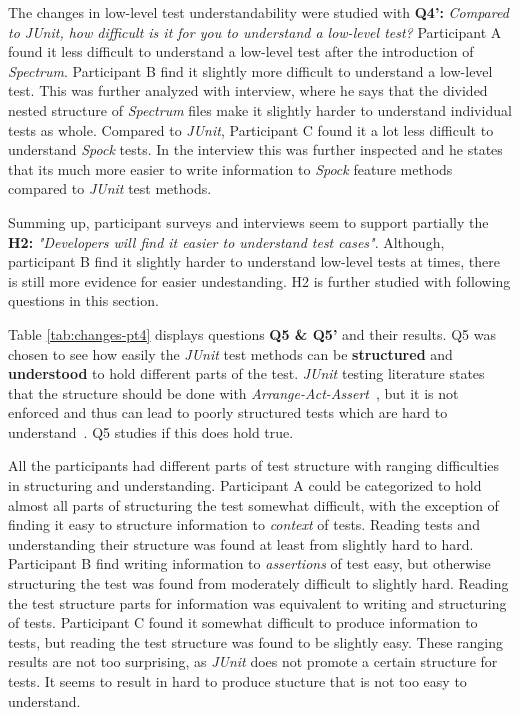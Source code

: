 The changes in low-level test understandability were studied with \textbf{Q4':} \textit{Compared to JUnit, how difficult is it
for you to understand a low-level test?} Participant A found it less difficult to understand a low-level
test after the introduction of \textit{Spectrum}. Participant B find it slightly more difficult to understand
a low-level test. This was further analyzed with interview, where he says that the divided nested structure of \textit{Spectrum}
files make it slightly harder to understand individual tests as whole. Compared to \textit{JUnit}, Participant C found it a lot less difficult to
understand \textit{Spock} tests. In the interview this was further inspected and he states that its much more easier to write
information to \textit{Spock} feature methods compared to \textit{JUnit} test methods.

Summing up, participant surveys and interviews seem to support partially the \textbf{H2:} \textit{"Developers will find it easier to understand test cases"}.
Although, participant B find it slightly harder to understand low-level tests at times, there is still more evidence for
easier undestanding. H2 is further studied with following questions in this section.

Table \ref{tab:changes-pt4} displays questions \textbf{Q5 \& Q5'} and their results. Q5 was chosen to see
how easily the \textit{JUnit} test methods can be \textbf{structured} and \textbf{understood} to hold different parts of the test. \textit{JUnit} testing literature states that
the structure should be done with \textit{Arrange-Act-Assert}~\cite{langr2015pragmatic}, but it is not enforced and thus can lead to poorly structured
tests which are hard to understand~\cite{kapelonis2016java}. Q5 studies if this does hold true.

All the participants had different parts of test
structure with ranging difficulties in structuring and understanding. Participant A could be categorized to hold almost all
parts of structuring the test somewhat difficult, with the exception of finding it easy to structure information to \textit{context} of tests.
Reading tests and understanding their structure was found at least from slightly hard to hard.
Participant B find writing information to \textit{assertions} of test easy, but otherwise structuring the test
was found from moderately difficult to slightly hard. Reading the test structure parts for information was equivalent
to writing and structuring of tests. Participant C found it somewhat difficult to produce information
to tests, but reading the test structure was found to be slightly easy. These ranging results are not too surprising,
as \textit{JUnit} does not promote a certain structure for tests. It seems to result in hard to produce stucture that is not
too easy to understand.

